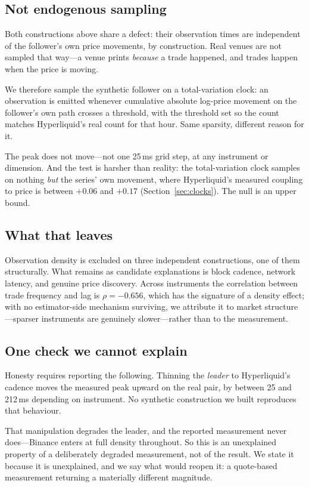 \documentclass[11pt,a4paper]{article}
\begin{document}
\subsection{Not endogenous sampling}

Both constructions above share a defect: their observation times are independent of the follower's
own price movements, by construction. Real venues are not sampled that way---a venue prints
\emph{because} a trade happened, and trades happen when the price is moving.

We therefore sample the synthetic follower on a total-variation clock: an observation is emitted
whenever cumulative absolute log-price movement on the follower's own path crosses a threshold,
with the threshold set so the count matches Hyperliquid's real count for that hour. Same sparsity,
different reason for it.

The peak does not move---not one 25\,ms grid step, at any instrument or dimension. And the test is
harsher than reality: the total-variation clock samples on nothing \emph{but} the series' own
movement, where Hyperliquid's measured coupling to price is between $+0.06$ and $+0.17$
(Section~\ref{sec:clocks}). The null is an upper bound.

\subsection{What that leaves}

Observation density is excluded on three independent constructions, one of them structurally.
What remains as candidate explanations is block cadence, network latency, and genuine price
discovery. Across instruments the correlation between trade frequency and lag is $\rho = -0.656$,
which has the signature of a density effect; with no estimator-side mechanism surviving, we
attribute it to market structure---sparser instruments are genuinely slower---rather than to the
measurement.

\subsection{One check we cannot explain}

Honesty requires reporting the following. Thinning the \emph{leader} to Hyperliquid's cadence
moves the measured peak upward on the real pair, by between 25 and 212\,ms depending on
instrument. No synthetic construction we built reproduces that behaviour.

That manipulation degrades the leader, and the reported measurement never does---Binance enters at
full density throughout. So this is an unexplained property of a deliberately degraded
measurement, not of the result. We state it because it is unexplained, and we say what would
reopen it: a quote-based measurement returning a materially different magnitude.
\end{document}
